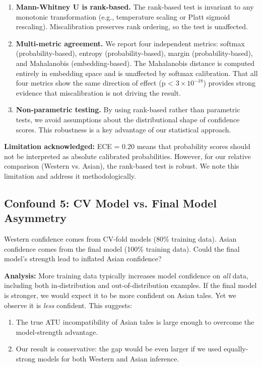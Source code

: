 \documentclass{article}
\begin{document}
\begin{enumerate}
\item \textbf{Mann-Whitney U is rank-based.} The rank-based test is invariant to any monotonic transformation (e.g., temperature scaling or Platt sigmoid rescaling). Miscalibration preserves rank ordering, so the test is unaffected.

\item \textbf{Multi-metric agreement.} We report four independent metrics: softmax (probability-based), entropy (probability-based), margin (probability-based), and Mahalanobis (embedding-based). The Mahalanobis distance is computed entirely in embedding space and is unaffected by softmax calibration. That all four metrics show the same direction of effect (p < $3 \times 10^{-18}$) provides strong evidence that miscalibration is not driving the result.

\item \textbf{Non-parametric testing.} By using rank-based rather than parametric tests, we avoid assumptions about the distributional shape of confidence scores. This robustness is a key advantage of our statistical approach.
\end{enumerate}

\textbf{Limitation acknowledged:} ECE = 0.20 means that probability scores should not be interpreted as absolute calibrated probabilities. However, for our relative comparison (Western vs. Asian), the rank-based test is robust. We note this limitation and address it methodologically.

\subsection{Confound 5: CV Model vs. Final Model Asymmetry}

Western confidence comes from CV-fold models (80\% training data). Asian confidence comes from the final model (100\% training data). Could the final model's strength lead to inflated Asian confidence?

\textbf{Analysis:} More training data typically increases model confidence on \textit{all} data, including both in-distribution and out-of-distribution examples. If the final model is stronger, we would expect it to be more confident on Asian tales. Yet we observe it is \textit{less} confident. This suggests:

\begin{enumerate}
\item The true ATU incompatibility of Asian tales is large enough to overcome the model-strength advantage.
\item Our result is conservative: the gap would be even larger if we used equally-strong models for both Western and Asian inference.
\end{enumerate}
\end{document}
